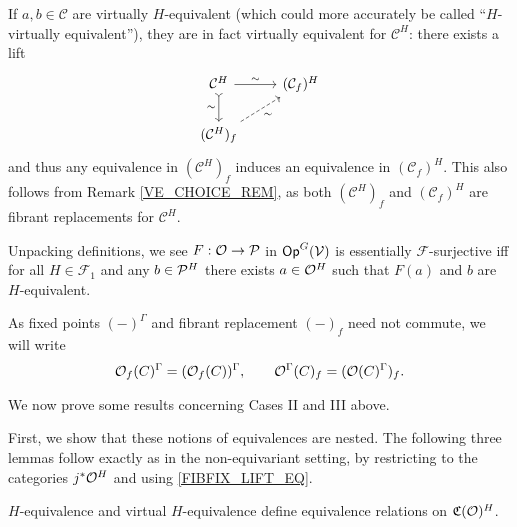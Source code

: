 \documentclass[a4paper,10pt
,draft
]{article}%
\renewcommand{\F}{\mathcal F}
\renewcommand{\1}{\eta}%
\begin{document}
\begin{remark}
      \label{HVIRT_REM}
      If $a,b\in \mathcal C$ are virtually $H$-equivalent (which could more accurately be called ``$H$-virtually equivalent''),
      they are in fact virtually equivalent for $\mathcal C^H$:
      there exists a lift
      \begin{equation}
            \label{FIBFIX_LIFT_EQ}
            \begin{tikzcd}
                  \mathcal C^H \arrow[d, tail, "\sim"'] \arrow[r, "\sim"]
                  &
                  (\mathcal C_f)^H
                  \\
                  (\mathcal C^H)_f \arrow[ur, dashed, "\sim"']
            \end{tikzcd}
      \end{equation}
      and thus any equivalence in $(\mathcal C^H)_f$ induces an equivalence in $(\mathcal C_f)^H$.
      This also follows from Remark \ref{VE_CHOICE_REM}, as both $(\mathcal C^H)_f$ and $(\mathcal C_f)^H$ are fibrant replacements for $\mathcal C^H$.
\end{remark}

\begin{remark}
      \label{ESS_SUR_REM}
      Unpacking definitions, we see
      $F: \O \to \P$ in $\Op^G(\V)$ is essentially $\F$-surjective iff
      for all $H \in \F_1$ and any $b \in \P^H$ there exists $a \in \O^H$ such that $F(a)$ and $b$ are $H$-equivalent.
\end{remark}

\begin{notation}
      As fixed points $(-)^\Gamma$ and fibrant replacement $(-)_f$ need not commute, we will write
      \begin{equation}
            \O_f(C)^\Gamma = (\O_f(C))^\Gamma,
            \qquad
            \O^\Gamma(C)_f = (\O(C)^{\Gamma})_f.
      \end{equation}
\end{notation}


We now prove some results concerning Cases II and III above.

First, we show that these notions of equivalences are nested.
The following three lemmas follow exactly as in the non-equivariant setting,
by restricting to the categories $j^{\**}\O^H$ and using \eqref{FIBFIX_LIFT_EQ}.

\begin{lemma}
      \label{CAV_4.10_LEM}
      $H$-equivalence and virtual $H$-equivalence define equivalence relations on $\mathfrak C(\O)^H$.
\end{lemma}
\end{document}
